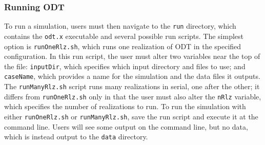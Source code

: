 \documentclass[preprint,12pt, a4paper]{elsarticle}
\begin{document}


\subsubsection{Running ODT}

To run a simulation, users must then navigate to the \texttt{run} directory, which contains the \texttt{odt.x} executable and several possible run scripts. The simplest option is \texttt{runOneRlz.sh}, which runs one realization of ODT in the specified configuration. In this run script, the user must alter two variables near the top of the file: \texttt{inputDir}, which specifies which input directory and files to use; and \texttt{caseName}, which provides a name for the simulation and the data files it outputs. The \texttt{runManyRlz.sh} script runs many realizations in serial, one after the other; it differs from \texttt{runOneRlz.sh} only in that the user must also alter the \texttt{nRlz} variable, which specifies the number of realizations to run. To run the simulation with either \texttt{runOneRlz.sh} or \texttt{runManyRlz.sh}, save the run script and execute it at the command line. Users will see some output on the command line, but no data, which is instead output to the \texttt{data} directory.  
\end{document}

